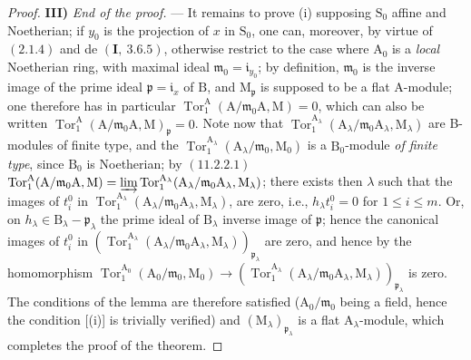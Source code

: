 \begin{proof}
\medskip
\noindent\textbf{III)} \emph{End of the proof.} --- It remains to prove (i) supposing $\mathrm{S}_0$ affine and Noetherian; if $y_0$ is the projection of $x$ in $\mathrm{S}_0$, one can, moreover, by virtue of $(2.1.4)$ and de $(\mathbf{I},~3.6.5)$, otherwise restrict to the case where $\mathrm{A}_0$ is a \emph{local} Noetherian ring, with maximal ideal $\mathfrak{m}_0=\mathfrak{i}_{y_0}$; by definition, $\mathfrak{m}_0$ is the inverse image of the prime ideal $\mathfrak{p}=\mathfrak{i}_x$ of $\mathrm{B}$, and $\mathrm{M}_\mathfrak{p}$ is supposed to be a flat A-module; one therefore has in particular $\operatorname{Tor}_1^\mathrm{A}(\mathrm{A}/\mathfrak{m}_0\mathrm{A},\mathrm{M})=0$, which can also be written $\operatorname{Tor}_1^\mathrm{A}(\mathrm{A}/\mathfrak{m}_0\mathrm{A},\mathrm{M})_\mathfrak{p}=0$.
Note now that $\operatorname{Tor}_1^{\mathrm{A}_\lambda}(\mathrm{A}_\lambda/\mathfrak{m}_0\mathrm{A}_\lambda,\mathrm{M}_\lambda)$ are B-modules of finite type, and the $\operatorname{Tor}_1^{\mathrm{A}_\lambda}(\mathrm{A}_\lambda/\mathfrak{m}_0,\mathrm{M}_0)$ is a $\mathrm{B}_0$-module \emph{of finite type}, since $\mathrm{B}_0$ is Noetherian; by $(11.2.2.1)$ $\operatorname{Tor}_1^\mathrm{A}(\mathrm{A}/\mathfrak{m}_0\mathrm{A},\mathrm{M})=\varinjlim\operatorname{Tor}_1^{\mathrm{A}_\lambda}(\mathrm{A}_\lambda/\mathfrak{m}_0\mathrm{A}_\lambda,\mathrm{M}_\lambda)$; there exists then $\lambda$ such that the images of $t_i^0$ in $\operatorname{Tor}_1^{\mathrm{A}_\lambda}(\mathrm{A}_\lambda/\mathfrak{m}_0\mathrm{A}_\lambda,\mathrm{M}_\lambda)$, are zero, i.e., $h_\lambda t_i^0=0$ for $1\leqslant i\leqslant m$. Or, on $h_\lambda\in\mathrm{B}_\lambda-\mathfrak{p}_\lambda$ the prime ideal of $\mathrm{B}_\lambda$ inverse image of $\mathfrak{p}$; hence the canonical images of $t_i^0$ in $(\operatorname{Tor}_1^{\mathrm{A}_\lambda}(\mathrm{A}_\lambda/\mathfrak{m}_0\mathrm{A}_\lambda,\mathrm{M}_\lambda))_{\mathfrak{p}_\lambda}$ are zero, and hence by the homomorphism $\operatorname{Tor}_1^{\mathrm{A}_0}(\mathrm{A}_0/\mathfrak{m}_0,\mathrm{M}_0)\to(\operatorname{Tor}_1^{\mathrm{A}_\lambda}(\mathrm{A}_\lambda/\mathfrak{m}_0\mathrm{A}_\lambda,\mathrm{M}_\lambda))_{\mathfrak{p}_\lambda}$ is zero. The conditions of the lemma  are therefore satisfied ($\mathrm{A}_0/\mathfrak{m}_0$ being a field, hence the condition [(i)] is trivially verified) and $(\mathrm{M}_\lambda)_{\mathfrak{p}_\lambda}$ is a flat $\mathrm{A}_\lambda$-module, which completes the proof of the theorem.


\end{proof}
